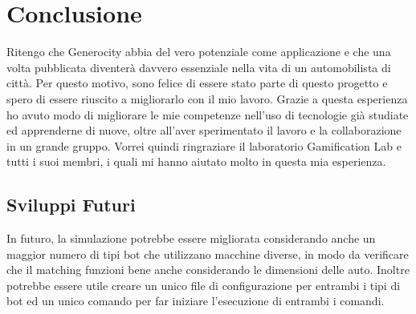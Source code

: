 \documentclass[main.tex]{subfiles}
\begin{document}
\sloppy


\vspace{1.0cm}

\chapter{Conclusione}\label{sec:Conclusione}
Ritengo che Generocity abbia del vero potenziale come applicazione e che una volta pubblicata diventerà davvero essenziale nella vita di un automobilista di città. Per questo motivo, sono felice di essere stato parte di questo progetto e spero di essere riuscito a migliorarlo con il mio lavoro. \newline
Grazie a questa esperienza ho avuto modo di migliorare le mie competenze nell'uso di tecnologie già studiate ed apprenderne di nuove, oltre all'aver sperimentato il lavoro e la collaborazione in un grande gruppo. \newline
Vorrei quindi ringraziare il laboratorio Gamification Lab e tutti i suoi membri, i quali mi hanno aiutato molto in questa mia esperienza.
  
\section{Sviluppi Futuri}
In futuro, la simulazione potrebbe essere migliorata considerando anche un maggior numero di tipi bot che utilizzano macchine diverse, in modo da verificare che il matching funzioni bene anche considerando le dimensioni delle auto. Inoltre potrebbe essere utile creare un unico file di configurazione per entrambi i tipi di bot ed un unico comando per far iniziare l'esecuzione di entrambi i comandi.
\end{document}
